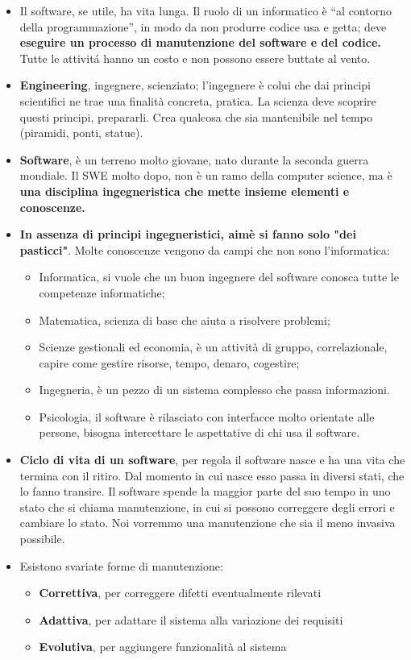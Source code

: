 \documentclass[a4paper,10pt] {article}
\begin{document}
\begin{itemize}
\item Il software, se utile, ha vita lunga. Il ruolo di un informatico è ``al
contorno della programmazione'', in modo da non produrre codice usa e getta; deve
\textbf{eseguire un processo di manutenzione del software e del codice.} Tutte le
attivit\'a hanno un costo e non possono essere buttate al vento.

\item \textbf{Engineering}, ingegnere, scienziato; l'ingegnere è colui che dai
principi scientifici ne trae una finalità concreta, pratica. La scienza deve
scoprire questi principi, prepararli. Crea qualcosa che sia mantenibile nel tempo
(piramidi, ponti, statue).
\item \textbf{Software}, è un terreno molto giovane, nato durante la seconda
guerra mondiale. Il SWE molto dopo, non è un ramo della computer science, ma
è \textbf{una disciplina ingegneristica che mette insieme elementi e
conoscenze.}
\item \textbf{In assenza di principi ingegneristici, aimè si fanno solo "dei
pasticci"}. Molte conoscenze vengono da campi che non sono l'informatica:
		\begin{itemize}
\item Informatica, si vuole che un buon ingegnere del software conosca tutte le
competenze informatiche;
		\item Matematica, scienza di base che aiuta a risolvere problemi;
\item Scienze gestionali ed economia, è un attività di gruppo, correlazionale,
capire come gestire risorse,
		tempo, denaro, cogestire;
		\item Ingegneria, è un pezzo di un sistema complesso che passa informazioni.
		\item Psicologia, il software è rilasciato con interfacce molto orientate alle
persone, bisogna intercettare le aspettative di chi usa il software.
		\end{itemize}

\item \textbf{Ciclo di vita di un software}, per regola il software nasce e ha
una vita che termina con il ritiro. Dal momento
in cui nasce esso passa in diversi stati, che lo fanno transire. Il software
spende la maggior parte del suo tempo
in uno stato che si chiama manutenzione, in cui si possono correggere degli errori
e cambiare lo stato. Noi
vorremmo una manutenzione che sia il meno invasiva possibile.
	\item Esistono svariate forme di manutenzione:
	\begin{itemize}
		\item \textbf{Correttiva}, per correggere difetti eventualmente rilevati
		\item \textbf{Adattiva}, per adattare il sistema alla variazione dei requisiti
		\item \textbf{Evolutiva}, per aggiungere funzionalità al sistema	


\end{itemize}
\end{itemize}
\end{document}
